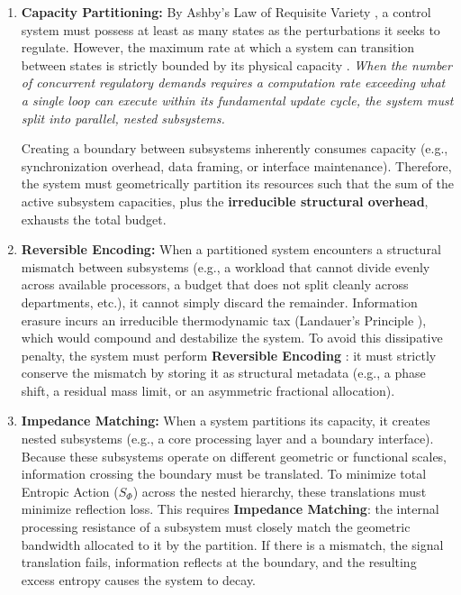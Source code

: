 \begin{enumerate}
    \item \textbf{Capacity Partitioning:}
    \label{rule_capacity_partitioning}
    By Ashby's Law of Requisite Variety \cite{raadt_ashbys_1987}, a control system must possess at least as many states as the perturbations it seeks to regulate. However, the maximum rate at which a system can transition between states is strictly bounded by its physical capacity \cite{margolus_maximum_1998}. \textit{When the number of concurrent regulatory demands requires a computation rate exceeding what a single loop can execute within its fundamental update cycle, the system must split into parallel, nested subsystems.}
    
    Creating a boundary between subsystems inherently consumes capacity (e.g., synchronization overhead, data framing, or interface maintenance). Therefore, the system must geometrically partition its resources such that the sum of the active subsystem capacities, plus the \textbf{irreducible structural overhead},  exhausts the total budget.

    \item \textbf{Reversible Encoding:}
    \label{rule_reversible_encoding}
    When a partitioned system encounters a structural mismatch between subsystems (e.g., a workload that cannot divide evenly across available processors, a budget that does not split cleanly across departments, etc.), it cannot simply discard the remainder. Information erasure incurs an irreducible thermodynamic tax (Landauer's Principle \cite{landauer_irreversibility_1961}), which would compound and destabilize the system. To avoid this dissipative penalty, the system must perform \textbf{Reversible Encoding} \cite{bennett_thermodynamics_1982}: it must strictly conserve the mismatch by storing it as structural metadata (e.g., a phase shift, a residual mass limit, or an asymmetric fractional allocation).

    \item \textbf{Impedance Matching:}
    \label{rule_impedance_matching}
    When a system partitions its capacity, it creates nested subsystems (e.g., a core processing layer and a boundary interface). Because these subsystems operate on different geometric or functional scales, information crossing the boundary must be translated.  To minimize total Entropic Action ($S_\Phi$) across the nested hierarchy, these translations must minimize reflection loss. This requires \textbf{Impedance Matching}\cite{shannon_communication_1949}: the internal processing resistance of a subsystem must closely match the geometric bandwidth allocated to it by the partition. If there is a mismatch, the signal translation fails, information reflects at the boundary, and the resulting excess entropy causes the system to decay.
\end{enumerate}

